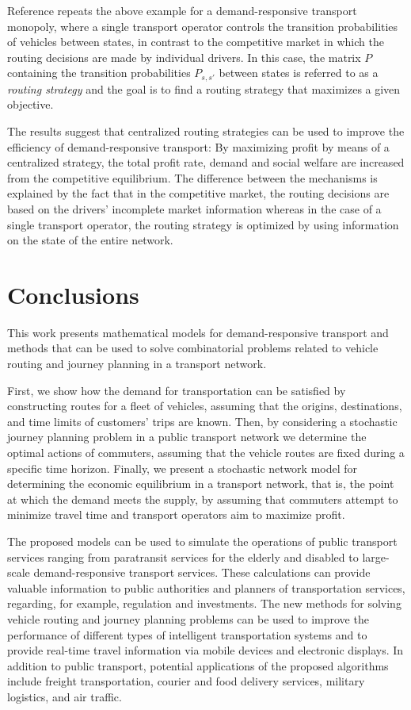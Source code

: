 \documentclass[dissertation,draft*]{aaltoseries}
\begin{document}
Reference \cite{kuhmostok} repeats the above example for a demand-responsive transport monopoly, where 
a single transport operator controls the transition probabilities of vehicles
between states, in contrast to the competitive market in which the routing decisions are made by individual drivers.
In this case, the matrix $P$ containing the transition probabilities $P_{s,s'}$ between states is referred to as a \emph{routing strategy} 
and the goal is to find a routing strategy that maximizes a given objective.

The results suggest that centralized routing strategies can be used to improve the efficiency of demand-responsive transport:
By maximizing profit by means of a centralized strategy, the total profit rate, demand and social welfare are increased from
the competitive equilibrium. The difference between the mechanisms is explained by the fact that in the competitive market, 
the routing decisions are based on the drivers' incomplete market information whereas in the case of a single transport operator,
the routing strategy is optimized by using information on the state of the entire network.



\chapter{Conclusions}
\label{conclusions}
This work presents mathematical models for demand-responsive transport and methods
that can be used to solve combinatorial problems related to vehicle routing and journey planning
in a transport network.

First,
we show how the demand for transportation can be satisfied by constructing routes for a fleet of vehicles,
assuming that the origins, destinations, and time limits of customers' trips are known.
Then, by considering a stochastic journey planning problem in a public transport network we determine
the optimal actions of commuters, assuming that the vehicle routes are fixed during a specific time horizon.
Finally, we present a stochastic network model
for determining the economic equilibrium in a transport network, that is, the point at which the demand meets the supply,
by assuming that commuters attempt to minimize travel time and transport operators aim to maximize profit.

The proposed models can be used to simulate the operations of public transport services ranging 
from paratransit services for the elderly and disabled to 
large-scale demand-responsive transport services. These calculations can 
provide valuable information to public authorities and planners of transportation services,
regarding, for example, regulation and investments.
The new methods for solving vehicle routing and journey planning problems can be 
used to improve the performance of different types of intelligent transportation systems and
to provide real-time travel information via mobile devices and electronic displays.
In addition to public transport, potential applications of the proposed algorithms
include freight transportation, courier and food delivery services, military logistics, and air traffic.
\end{document}
